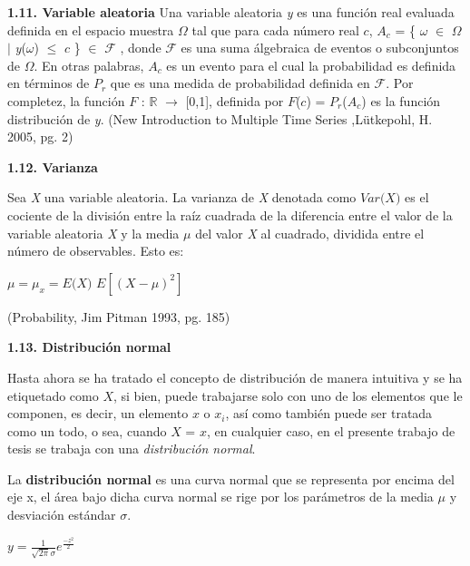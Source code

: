 {
\noindent
\Large  \textbf{1.11. Variable aleatoria} 
}
\newline
Una variable aleatoria \textit{y} es una función real evaluada definida en el espacio muestra $\mathit{\Omega}$ tal que para cada número real $\mathit{c}$, $A_{c}$ =  \{ $\omega$ $\in$ $\Omega$ $\mid$ \textit{y}($\omega$) $\leq$ $\mathit{c}$ \} $\in$  $\mathcal{F}$ , donde $\mathcal{F}$ es una suma álgebraica de eventos o subconjuntos de $\mathit{\Omega}$. En otras palabras, $A_{c}$ es un evento para el cual la probabilidad es definida en términos de $P_{r}$ que es una medida de probabilidad definida en $\mathcal{F}$. Por completez, la función $\mathit{F}$ : $\mathbb{R}$ $ \rightarrow$ [0,1], definida por $\mathit{F}$($\mathit{c}$) = $P_{r}$($A_{c}$) es la función distribución de  \textit{y}. (New Introduction to Multiple Time Series ,L\"{u}tkepohl, H. 2005, pg. 2)
\newline

{
\noindent
\Large  \textbf{1.12. Varianza} 
}

Sea \textit{X} una variable aleatoria. La varianza de \textit{X} denotada como $\textit{Var(X)}$  es el cociente de la división entre la raíz cuadrada de la diferencia entre el valor de la variable aleatoria \textit{X} y la media $\mu$ del valor \textit{X} al cuadrado, dividida entre el número de observables. Esto es:

\begin{center}
\hspace{3cm}$\mu = \mu_x = \textit{E(X)}$
\newline
$E[(X - \mu)^2]$
\end{center}
(Probability, Jim Pitman 1993, pg. 185)
\newpage

{
\noindent
\Large  \textbf{1.13. Distribución normal} 
}

Hasta ahora se ha tratado el concepto de distribución de manera intuitiva y  se ha etiquetado como $\textit{X}$, si bien, puede trabajarse solo con uno de los elementos que le componen, es decir, un elemento $\textit{x}$ o $\textit{x}_i$, así como también puede ser tratada como un todo, o sea, cuando $\textit{X = x}$, en cualquier caso, en el presente trabajo de tesis se trabaja con una \textit{distribución normal}.

La \textbf{distribución normal} es una curva normal que se representa por encima del eje x, el área bajo dicha curva normal se rige por los parámetros de la media $\mu$ y desviación estándar $\sigma$.

\begin{center}
$y = \frac{1}{\sqrt{2\pi}\sigma} e^{\frac{-z^2}{2}}$
\end{center} 

